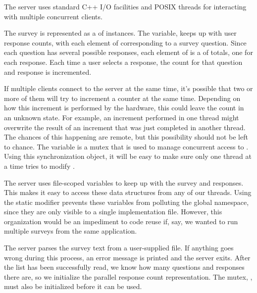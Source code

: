 \begin{topcode}


The server uses standard C++ I/O facilities and POSIX threads for
interacting with multiple concurrent clients.


The survey is represented as a  of 
instances.  The variable,  keeps up with user response
counts, with each element of  corresponding to a survey
question.  Since each question has several possible responses, each
element of  is a  of totals, one for each
response.  Each time a user selects a response, the count for that
question and response is incremented.

If multiple clients connect to the server at the same time, it's
possible that two or more of them will try to increment a counter at
the same time.  Depending on how this increment is performed by the
hardware, this could leave the count in an unknown state.  For example,
an increment performed in one thread might overwrite the result of an
increment that was just completed in another thread.  The chances of
this happening are remote, but this possibility should not be left to
chance.  The  variable is a mutex that is used to manage
concurrent access to .  Using this synchronization object,
it will be easy to make sure only one thread at a time tries to modify
.

The server uses file-scoped variables to keep up with the survey and
responses.  This makes it easy to access these data structures from
any of our threads.  Using the static modifier prevents these
variables from polluting the global namespace, since they are only
visible to a single implementation file.  However, this organization
would be an impediment to code reuse if, say, we wanted to run
multiple surveys from the same application.


The server parses the survey text from a user-supplied file.  If
anything goes wrong during this process, an error message is printed
and the server exits.  After the  list has been
successfully read, we know how many questions and responses there are,
so we initialize the parallel response count representation.  The
mutex, , must also be initialized before it can be used.


\end{topcode}
